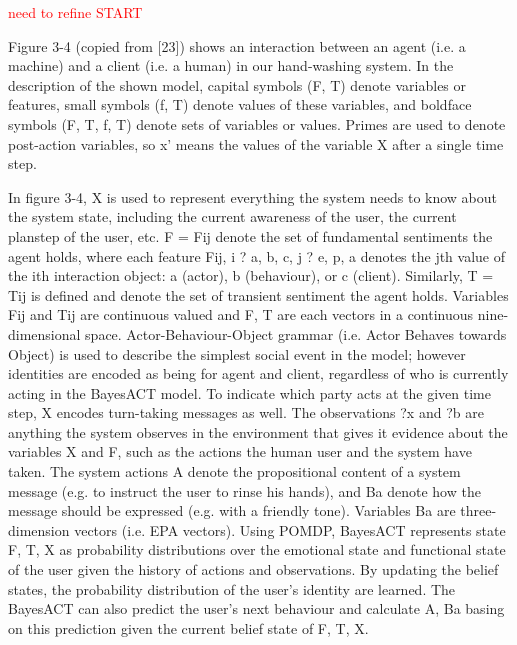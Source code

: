 
\textcolor{red}{need to refine START}

Figure 3-4 (copied from [23]) shows an interaction between an agent (i.e. a machine) and a client (i.e. a human) in our hand-washing system. In the description of the shown model, capital symbols (F, T) denote variables or features, small symbols (f, T) denote values of these variables, and boldface symbols (F, T, f, T) denote sets of variables or values. Primes are used to denote post-action variables, so x' means the values of the variable X after a single time step.

In figure 3-4, X is used to represent everything the system needs to know about the system state, including the current awareness of the user, the current planstep of the user, etc. F = {Fij} denote the set of fundamental sentiments the agent holds, where each feature Fij, i ? {a, b, c}, j ? {e, p, a} denotes the jth value of the ith interaction object: a (actor), b (behaviour), or c (client). Similarly, T = {Tij} is defined and denote the set of transient sentiment the agent holds. Variables Fij and Tij are continuous valued and F, T are each vectors in a continuous nine-dimensional space. Actor-Behaviour-Object grammar (i.e. Actor Behaves towards Object) is used to describe the simplest social event in the model; however identities are encoded as being for agent and client, regardless of who is currently acting in the BayesACT model. To indicate which party acts at the given time step, X encodes turn-taking messages as well. The observations ?x and ?b are anything the system observes in the environment that gives it evidence about the variables X and F, such as the actions the human user and the system have taken. The system actions A denote the propositional content of a system message (e.g. to instruct the user to rinse his hands), and Ba denote how the message should be expressed (e.g. with a friendly tone). Variables Ba are three-dimension vectors (i.e. EPA vectors). Using POMDP, BayesACT represents state {F, T, X} as probability distributions over the emotional state and functional state of the user given the history of actions and observations. By updating the belief states, the probability distribution of the user's identity are learned. The BayesACT can also predict the user's next behaviour and calculate {A, Ba} basing on this prediction given the current belief state of {F, T, X}.

